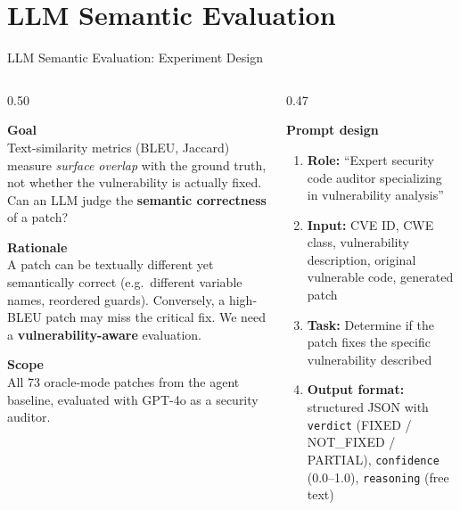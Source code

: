 \documentclass[aspectratio=169,10pt]{beamer}
\begin{document}
\section{LLM Semantic Evaluation}

\begin{frame}{LLM Semantic Evaluation: Experiment Design}
\begin{columns}[T]
\begin{column}{0.50\textwidth}

  \textbf{Goal}\\[3pt]
  {\small Text-similarity metrics (BLEU, Jaccard) measure \textit{surface overlap}
  with the ground truth, not whether the vulnerability is actually fixed.
  Can an LLM judge the \textbf{semantic correctness} of a patch?}

  \vspace{0.6em}
  \textbf{Rationale}\\[3pt]
  {\small A patch can be textually different yet semantically correct
  (e.g.\ different variable names, reordered guards).
  Conversely, a high-BLEU patch may miss the critical fix.
  We need a \textbf{vulnerability-aware} evaluation.}

  \vspace{0.6em}
  \textbf{Scope}\\[3pt]
  {\small All 73 oracle-mode patches from the agent baseline, evaluated
  with GPT-4o as a security auditor.}

\end{column}
\begin{column}{0.47\textwidth}

  \textbf{Prompt design}

  \vspace{0.3em}
  {\scriptsize
  \begin{enumerate}\setlength{\itemsep}{3pt}
    \item \textbf{Role:} ``Expert security code auditor specializing
          in vulnerability analysis''
    \item \textbf{Input:} CVE ID, CWE class, vulnerability description,
          original vulnerable code, generated patch
    \item \textbf{Task:} Determine if the patch fixes the specific
          vulnerability described
    \item \textbf{Output format:} structured JSON with
          \texttt{verdict} (FIXED / NOT\_FIXED / PARTIAL),
          \texttt{confidence} (0.0--1.0),
          \texttt{reasoning} (free text)
  \end{enumerate}}


\end{column}
\end{columns}
\end{frame}
\end{document}
